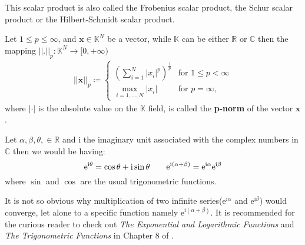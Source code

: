 \noindent This scalar product is also called the Frobenius scalar product, the Schur scalar product or 
the Hilbert-Schmidt scalar product.

\begin{Def}\label{def:p-norm}
    Let $1 \leq p \leq \infty$, and $\boldsymbol{x} \in \mathbb{K}^N$ be a vector, while $\mathbb{K}$ can be either $\mathbb{R}$ or $\mathbb{C}$ then the mapping $\left|\left| \boldsymbol{.} \right|\right|_p \colon \mathbb{K}^N \to [0,+\infty)$
    \begin{equation}
        \begin{split} 
            \left|\left|\boldsymbol{x}\right|\right|_p \coloneqq    
            \begin{cases}
                \left(\sum_{i=1}^{N}\left|x_i\right|^p\right)^{\frac{1}{p}} & \text{for } 1 \leq p < \infty\\
                \underset{{i=1,\dots,N}}{\max} \left|x_i\right| & \text{for } p = \infty,
            \end{cases}
        \end{split}
    \end{equation}
    where $\left|\boldsymbol{\cdot}\right|$ is the absolute value on the $\mathbb{K}$ field,
    is called the \textbf{p-norm} of the vector $\boldsymbol{x}$.
\end{Def}
\begin{Thm}\label{theorem:euler_formula}
    Let $\alpha,\beta,\theta, \in \mathbb{R}$ and $\mathrm{i}$ the imaginary unit associated with the complex numbers in $\mathbb{C}$ 
    then we would be having:
	\begin{equation}
		\mathrm{e}^{\mathrm{i}\theta} = \cos \theta +  \mathrm{i}\sin \theta \qquad  \mathrm{e}^{\mathrm{i}(\alpha+\beta)} = \mathrm{e}^{\mathrm{i}\alpha}\mathrm{e}^{\mathrm{i}\beta}\index{Euler formula}\index{Function!$\exp$}\index{Function!$\sin$}\index{Function!$\cos$}
	\end{equation}
    where $\sin$ and $\cos$ are the usual trigonometric functions.
	\end{Thm}
	\begin{Rem}
	It is not so obvious why multiplication of two infinite series($\mathrm{e}^{\mathrm{i}\alpha}$ and $\mathrm{e}^{\mathrm{i}\beta}$) would converge, let alone to a specific function namely  $\mathrm{e}^{\mathrm{i}(\alpha+\beta)}$.
    It is recommended for the curious reader to check out \emph{The Exponential and Logarithmic Functions} and \emph{The Trigonometric Functions} in Chapter 8 of \cite{Rudin1976}. 
	\end{Rem}
